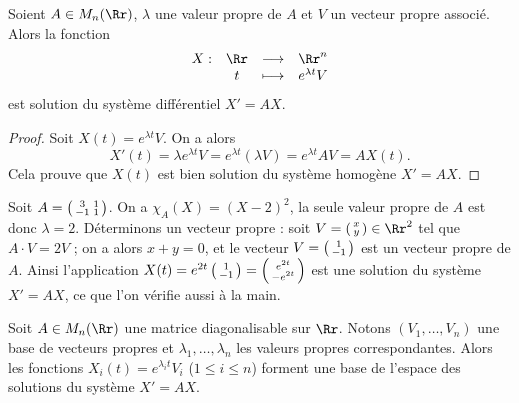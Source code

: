 \documentclass[12pt, class=report,crop=false]{standalone}
\begin{document}
\begin{proposition}
\label{prop:sysdiff}
Soient $A\in M_n(\Rr)$, $\lambda$ une valeur propre de $A$ et $V$ un vecteur propre associé. 
Alors la fonction 
$$\begin{array}{cccc}
X : & \Rr & \longrightarrow & \Rr^n\cr 
    &t &\longmapsto & e^{\lambda t} V
    \end{array}$$
est solution du système différentiel $X'=AX$.
\end{proposition} 

\begin{proof}
Soit %
$X(t)=e^{\lambda t}V$. 
On a alors
$$X'(t)=\lambda e^{\lambda t} V=e^{\lambda t}(\lambda V)=e^{\lambda t} AV=AX(t).$$
Cela prouve que $X(t)$ est bien solution du système homogène $X'=AX$.
\end{proof}



\begin{exemple}
Soit $A=\left(\begin{smallmatrix}3&1\cr -1&1\end{smallmatrix}\right)$.
On a $\chi_A(X)=(X-2)^2$, la seule valeur propre de $A$ est donc $\lambda=2$.
Déterminons un vecteur propre : soit $V=\left(\begin{smallmatrix}x \cr y\end{smallmatrix}\right)\in\Rr^2$ tel que $A \cdot V=2V$ ;
on a alors $x+y=0$, et le vecteur $V=\left(\begin{smallmatrix} 1 \cr -1 \end{smallmatrix}\right)$ est un vecteur propre de $A$. Ainsi l'application 
$X(t)=e^{2t}\left(\begin{smallmatrix}1\cr-1\end{smallmatrix}\right) = \left(\begin{smallmatrix}e^{2t}\cr-e^{2t}\end{smallmatrix}\right)$ 
est une solution du système $X'=AX$, ce que l'on vérifie aussi à la main.
\end{exemple}



\bigskip


\begin{theoreme}
Soit $A\in M_n(\Rr)$ une matrice diagonalisable sur $\Rr$. Notons 
$(V_1,\ldots,V_n)$ une base de vecteurs propres et $\lambda_1,\ldots,\lambda_n$ les valeurs propres correspondantes. Alors les fonctions $X_i(t)=e^{\lambda_i t}V_i$ ($1\le i\le n$) forment une base de l'espace des solutions du système $X'=AX$.
\end{theoreme}
\end{document}
